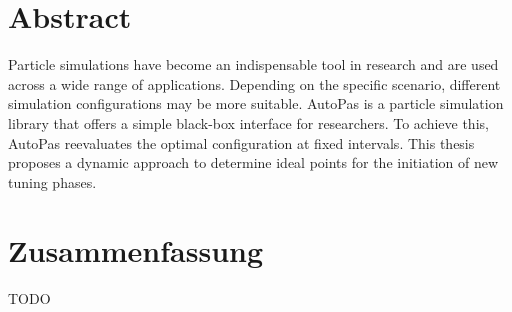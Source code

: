 \thispagestyle{plain}

\chapter*{Abstract}

Particle simulations have become an indispensable tool in research and are used across a wide range of applications. Depending on the specific scenario, different simulation configurations may be more suitable. AutoPas is a particle simulation library that offers a simple black-box interface for researchers. To achieve this, AutoPas reevaluates the optimal configuration at fixed intervals. This thesis proposes a dynamic approach to determine ideal points for the initiation of new tuning phases.



\MediaOptionLogicBlank

\chapter*{Zusammenfassung}

TODO

\MediaOptionLogicBlank